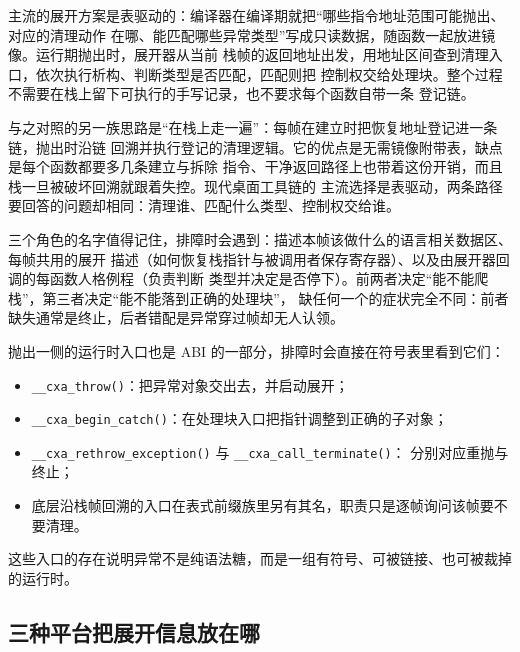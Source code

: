 \documentclass[12pt,a4paper,fontset=fandol]{ctexbook}
\newcommand{\Fn}[1]{\texttt{#1()}}
\newcommand{\Bk}{\discretionary{}{}{}}
\begin{document}
主流的展开方案是表驱动的：编译器在编译期就把“哪些指令地址范围可能抛出、对应的清理动作
在哪、能匹配哪些异常类型”写成只读数据，随函数一起放进镜像。运行期抛出时，展开器从当前
栈帧的返回地址出发，用地址区间查到清理入口，依次执行析构、判断类型是否匹配，匹配则把
控制权交给处理块。整个过程不需要在栈上留下可执行的手写记录，也不要求每个函数自带一条
登记链。

与之对照的另一族思路是“在栈上走一遍”：每帧在建立时把恢复地址登记进一条链，抛出时沿链
回溯并执行登记的清理逻辑。它的优点是无需镜像附带表，缺点是每个函数都要多几条建立与拆除
指令、干净返回路径上也带着这份开销，而且栈一旦被破坏回溯就跟着失控。现代桌面工具链的
主流选择是表驱动，两条路径要回答的问题却相同：清理谁、匹配什么类型、控制权交给谁。

三个角色的名字值得记住，排障时会遇到：描述本帧该做什么的语言相关数据区、每帧共用的展开
描述（如何恢复栈指针与被调用者保存寄存器）、以及由展开器回调的每函数人格例程（负责判断
类型并决定是否停下）。前两者决定“能不能爬栈”，第三者决定“能不能落到正确的处理块”，
缺任何一个的症状完全不同：前者缺失通常是终止，后者错配是异常穿过帧却无人认领。

抛出一侧的运行时入口也是 ABI 的一部分，排障时会直接在符号表里看到它们：

\begin{itemize}
\item \Fn{\_\_cxa{\Bk}\_throw}：把异常对象交出去，并启动展开；
\item \Fn{\_\_cxa{\Bk}\_begin{\Bk}\_catch}：在处理块入口把指针调整到正确的子对象；
\item \Fn{\_\_cxa{\Bk}\_rethrow{\Bk}\_exception} 与 \Fn{\_\_cxa{\Bk}\_call{\Bk}\_terminate}：
  分别对应重抛与终止；
\item 底层沿栈帧回溯的入口在表式前缀族里另有其名，职责只是逐帧询问该帧要不要清理。
\end{itemize}

这些入口的存在说明异常不是纯语法糖，而是一组有符号、可被链接、也可被裁掉的运行时。

\subsection{三种平台把展开信息放在哪}\label{sec:cl13-unwind-where}
\end{document}
